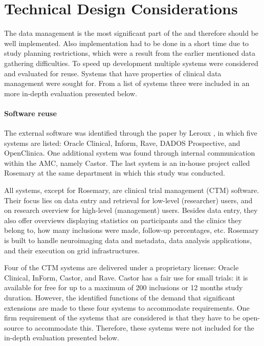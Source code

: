 \section{Technical Design Considerations}
\label{reuse}


The data management is the most significant part of the \ivfsystem{} and therefore should be well implemented.
Also implementation had to be done in a short time due to study planning restrictions, which were a result from the earlier mentioned data gathering difficulties.
To speed up development multiple systems were considered and evaluated for reuse.
Systems that have properties of clinical data management were sought for.
From a list of systems three were included in an more in-depth evaluation presented below.

\paragraph{Software reuse}
The external software was identified through the paper by Leroux \cite{leroux2011}, in which five systems are listed: Oracle Clinical, Inform, Rave, DADOS Prospective, and OpenClinica.
One additional system was found through internal communication within the AMC, namely Castor.
The last system is an in-house project called Rosemary at the same department in which this study was conducted.

All systems, except for Rosemary, are clinical trial management (CTM) software.
Their focus lies on data entry and retrieval for low-level (researcher) users, and on research overview for high-level (management) users.
Besides data entry, they also offer overviews displaying statistics on participants and the clinics they belong to, how many inclusions were made, follow-up percentages, etc.
Rosemary is built to handle neuroimaging data and metadata, data analysis applications, and their execution on grid infrastructures.

Four of the CTM systems are delivered under a proprietary license: Oracle Clinical, InForm, Castor, and Rave.
Castor has a fair use for small trials: it is available for free for up to a maximum of 200 inclusions or 12 months study duration.
However, the identified functions of the \ivfsystem{} demand that significant extensions are made to these four systems to accommodate requirements.
One firm requirement of the systems that are considered is that they have to be open-source to accommodate this.
Therefore, these systems were not included for the in-depth evaluation presented below.

